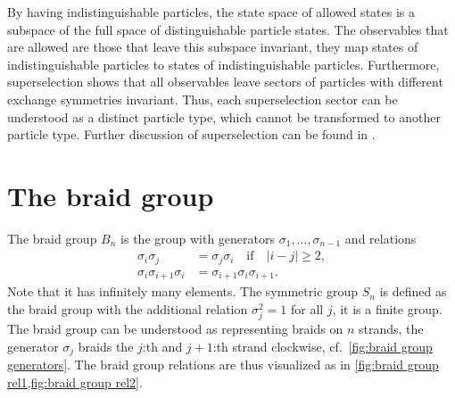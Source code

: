 \documentclass[a4paper,10pt,oneside]{book}
\theoremstyle{plain}
\theoremstyle{definition}
\theoremstyle{remark}
\begin{document}
By having indistinguishable particles, the state space of allowed states is a subspace of the full space of distinguishable particle states. The observables that are allowed are those that leave this subspace invariant, they map states of indistinguishable particles to states of indistinguishable particles. Furthermore, superselection shows that all observables leave sectors of particles with different exchange symmetries invariant. Thus, each superselection sector can be understood as a distinct particle type, which cannot be transformed to another particle type. Further discussion of superselection can be found in \cite{preskill,kitaev}.


































\section{The braid group}\label{sec:braid group}

The braid group $B_n$ is the group with generators $σ_1, \ldots, σ_{n-1}$ and relations
\begin{subequations}
\label{eq:braid relations}
  \begin{align}
    \label{eq:braid relation 1}
    σ_i σ_j &= σ_j σ_i \quad\text{if}\quad |i-j| \ge 2, \\
    \label{eq:braid relation 2}
    σ_i σ_{i+1} σ_i &= σ_{i+1} σ_i σ_{i+1}.
  \end{align}
\end{subequations}
Note that it has infinitely many elements. The symmetric group $S_n$ is defined as the braid group with the additional relation $σ_j^2=1$ for all $j$, it is a finite group. The braid group can be understood as representing braids on $n$ strands, the generator $σ_j$ braids the $j$:th and $j+1$:th strand clockwise, cf.\ \cref{fig:braid group generators}. The braid group relations are thus visualized as in \cref{fig:braid group rel1,fig:braid group rel2}.
\end{document}
